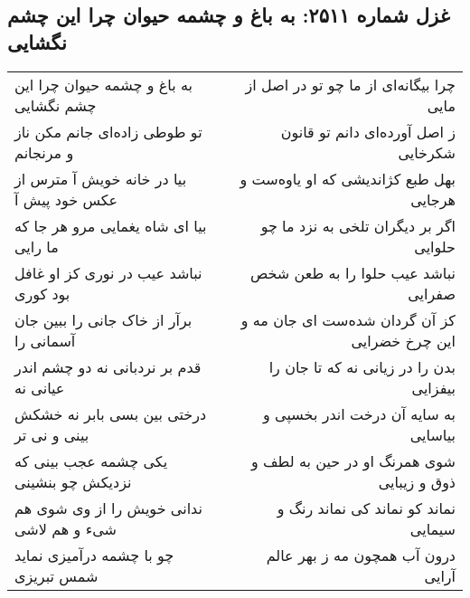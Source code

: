 \begin{center}
\section*{غزل شماره ۲۵۱۱: به باغ و چشمه حیوان چرا این چشم نگشایی}
\label{sec:2511}
\begin{longtable}{l p{0.5cm} r}
به باغ و چشمه حیوان چرا این چشم نگشایی
&&
چرا بیگانه‌ای از ما چو تو در اصل از مایی
\\
تو طوطی زاده‌ای جانم مکن ناز و مرنجانم
&&
ز اصل آورده‌ای دانم تو قانون شکرخایی
\\
بیا در خانه خویش آ مترس از عکس خود پیش آ
&&
بهل طبع کژاندیشی که او یاوه‌ست و هرجایی
\\
بیا ای شاه یغمایی مرو هر جا که ما رایی
&&
اگر بر دیگران تلخی به نزد ما چو حلوایی
\\
نباشد عیب در نوری کز او غافل بود کوری
&&
نباشد عیب حلوا را به طعن شخص صفرایی
\\
برآر از خاک جانی را ببین جان آسمانی را
&&
کز آن گردان شده‌ست ای جان مه و این چرخ خضرایی
\\
قدم بر نردبانی نه دو چشم اندر عیانی نه
&&
بدن را در زیانی نه که تا جان را بیفزایی
\\
درختی بین بسی بابر نه خشکش بینی و نی تر
&&
به سایه آن درخت اندر بخسپی و بیاسایی
\\
یکی چشمه عجب بینی که نزدیکش چو بنشینی
&&
شوی همرنگ او در حین به لطف و ذوق و زیبایی
\\
ندانی خویش را از وی شوی هم شیء و هم لاشی
&&
نماند کو نماند کی نماند رنگ و سیمایی
\\
چو با چشمه درآمیزی نماید شمس تبریزی
&&
درون آب همچون مه ز بهر عالم آرایی
\\
\end{longtable}
\end{center}
